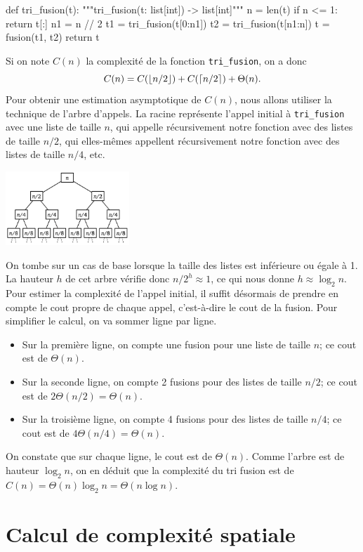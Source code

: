 \documentclass{magnolia}
\begin{document}
\begin{pythoncodeline}
def tri_fusion(t):
    """tri_fusion(t: list[int]) -> list[int]"""
    n = len(t)
    if n <= 1:
        return t[:]
    n1 = n // 2
    t1 = tri_fusion(t[0:n1])
    t2 = tri_fusion(t[n1:n])
    t = fusion(t1, t2)
    return t
\end{pythoncodeline}
Si on note $C(n)$ la complexité de la fonction \verb!tri_fusion!,
on a donc
\[C(n)=C(\left\lfloor n/2\right\rfloor) + C(\left\lceil n/2\right\rceil)+\Theta(n).\]
Pour obtenir une estimation asymptotique de $C(n)$, nous allons utiliser la technique
de l'arbre d'appels. La racine représente l'appel initial à \verb!tri_fusion! 
avec une liste de taille $n$, qui
appelle récursivement notre fonction avec des listes de taille $n/2$, qui elles-mêmes appellent
récursivement notre fonction avec des listes de taille $n/4$, etc. 
\begin{center}
\includegraphics[width=0.35\textwidth]{../../Commun/Images/python-cours-merge}
\end{center}
On tombe sur un cas de base lorsque la taille des listes est inférieure ou égale à 1.
La hauteur $h$ de cet arbre vérifie donc $n/2^h \approx 1$, ce qui nous donne
$h\approx \log_2 n$.
Pour estimer la complexité de l'appel initial, il suffit désormais de
prendre en compte le cout propre de chaque appel, c'est-à-dire le cout de la fusion. Pour
simplifier le calcul, on va sommer ligne par ligne.
\begin{itemize}
\item Sur la première ligne, on compte une fusion pour une liste de taille $n$; ce cout est de $\Theta(n)$.
\item Sur la seconde ligne,
on compte 2 fusions pour des listes de taille $n/2$; ce cout est de
$2\Theta(n/2)=\Theta(n)$.
\item Sur la troisième ligne, on compte 4 fusions pour des listes
de taille $n/4$; ce cout est de $4\Theta(n/4)=\Theta(n)$.
\end{itemize}
On constate que sur chaque
ligne, le cout est de $\Theta(n)$. Comme l'arbre est de hauteur $\log_2 n$, on en déduit
que la complexité du tri fusion est de $C(n)=\Theta(n)\log_2 n=\Theta(n\log n)$.

\section{Calcul de complexité spatiale}
\end{document}
